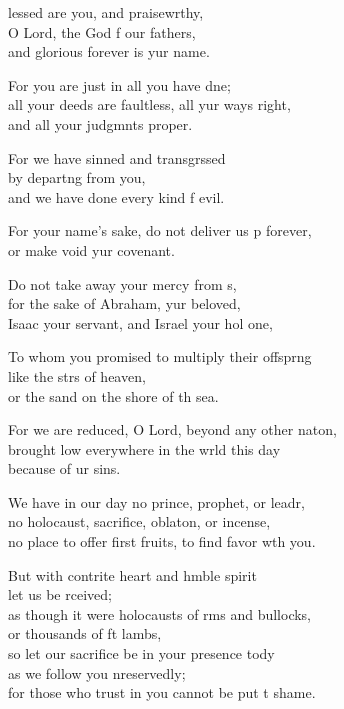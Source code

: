\settowidth{\versewidth}{no place to offer first fruits, to find favor with you.}
\begin{psalmverse}%
  \begin{patverse}
lessed are you, and praisewrthy,\Flex\\
O Lord, the God f our fathers,\Med\\
and glorious forever is yur name.

For you are just in all you have dne;\Flex\\
all your deeds are faultless, all yur ways right,\Med\\
and all your judgmnts proper.

For we have sinned and transgrssed\Flex\\
by depart\pointup{\i}ng from you,\Med\\
and we have done every kind f evil.

For your name’s sake, do not deliver us p forever,\Med\\
or make void yur covenant.

Do not take away your mercy from s,\Flex\\
for the sake of Abraham, yur beloved,\Med\\
Isaac your servant, and Israel your hol one,

To whom you promised to multiply their offspr\pointup{\i}ng\Flex\\
like the strs of heaven,\Med\\
or the sand on the shore of th sea.

For we are reduced, O Lord, beyond any other nat\pointup{\i}on,\Flex\\
brought low everywhere in the wrld this day\Med\\
because of ur sins.

We have in our day no prince, prophet, or leadr,\Flex\\
no holocaust, sacrifice, oblat\pointup{\i}on, or incense,\Med\\
no place to offer first fruits, to find favor w\pointup{\i}th you.

But with contrite heart and hmble spirit\Med\\
let us be rceived;\\
as though it were holocausts of rms and bullocks,\Med\\
or thousands of ft lambs,\\
so let our sacrifice be in your presence tody\Flex\\
as we follow you nreservedly;\Med\\
for those who trust in you cannot be put t shame.


\end{patverse}
\end{psalmverse}
